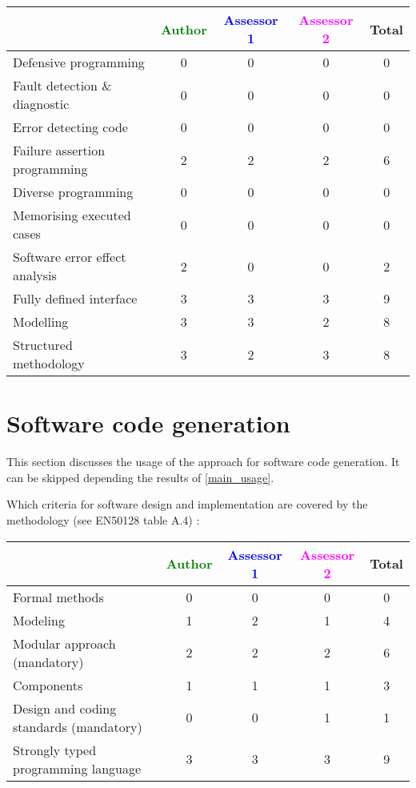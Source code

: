 \begin{tabular}{|l | c | c | c | c|}
\hline
& \textcolor{green}{Author} & \textcolor{blue}{Assessor 1} & \textcolor{magenta}{Assessor 2} & Total \\
\hline
Defensive programming & 0 & 0 & 0 & 0 \\
\hline
Fault detection \& diagnostic & 0 & 0 & 0 & 0 \\
\hline
Error detecting code & 0 & 0 & 0 & 0 \\
\hline
Failure assertion programming & 2 & 2 & 2 & 6 \\
\hline
Diverse programming & 0 & 0 & 0 & 0 \\
\hline
Memorising executed cases & 0 & 0 & 0 & 0 \\
\hline
Software error effect analysis & 2 & 0 & 0 & 2 \\
\hline
Fully defined interface & 3 & 3 & 3 & 9 \\
\hline
Modelling & 3 & 3 & 2 & 8 \\
\hline
Structured methodology & 3 & 2 & 3 & 8 \\
\hline
\end{tabular}

\section{Software code generation}
This section discusses the usage of the approach for software code generation.
It can be skipped depending the results of \ref{main_usage}.

Which criteria for software design and implementation are covered by the methodology
(see EN50128 table A.4) :

\begin{tabular}{|l | c | c | c | c|}
\hline
& \textcolor{green}{Author} & \textcolor{blue}{Assessor 1} & \textcolor{magenta}{Assessor 2} & Total \\
\hline
Formal methods & 0 & 0 & 0 & 0 \\
\hline
Modeling & 1 & 2 & 1 & 4 \\
\hline
Modular approach (mandatory) & 2 & 2 & 2 & 6 \\
\hline
Components & 1 & 1 & 1 & 3 \\
\hline
Design and coding standards (mandatory) & 0 & 0 & 1 & 1 \\
\hline
Strongly typed programming language & 3 & 3 & 3 & 9 \\
\hline
\end{tabular}

